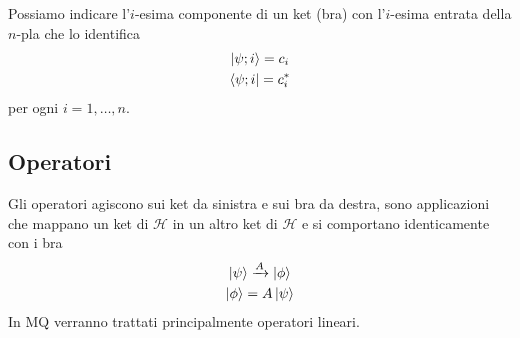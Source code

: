 \documentclass{article}
\begin{document}
Possiamo indicare l'$i$-esima componente di un ket (bra) con l'$i$-esima entrata della $n$-pla che lo identifica
\begin{gather}
    \ket{\psi; i} = c_i \notag \\
    \bra{\psi; i} = c_i^* \notag
\end{gather}
per ogni $i = 1, \dots, n$.

\newpage
\subsection{Operatori}
Gli operatori agiscono sui ket da sinistra e sui bra da destra, sono applicazioni che mappano un ket di $\mathcal{H}$ in un altro ket di $\mathcal{H}$ e si comportano identicamente con i bra
\begin{gather}
    \ket{\psi} \xrightarrow{A} \ket{\phi} \notag \\
    \ket{\phi} = A\ket{\psi} \notag
\end{gather}
In MQ verranno trattati principalmente operatori lineari.
\end{document}
